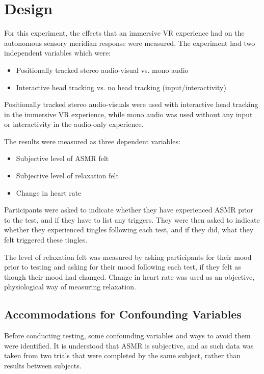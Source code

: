 \documentclass{sigchi}
\begin{document}
\section{Design}
For this experiment, the effects that an immersive VR experience had on the autonomous sensory meridian response were measured. The experiment had two independent variables which were:
\begin{itemize}
\item{Positionally tracked stereo audio-visual vs. mono audio}
\item{Interactive head tracking vs. no head tracking (input/interactivity)}
\end{itemize}

Positionally tracked stereo audio-visuals were used with interactive head tracking in the immersive VR experience, while mono audio was used without any input or interactivity in the audio-only experience.

The results were measured as three dependent variables:

\begin{itemize}
\item{Subjective level of ASMR felt}
\item{Subjective level of relaxation felt}
\item{Change in heart rate}
\end{itemize}

Participants were asked to indicate whether they have experienced ASMR prior to the test, and if they have to list any triggers. They were then asked to indicate whether they experienced tingles following each test, and if they did, what they felt triggered these tingles.

The level of relaxation felt was measured by asking participants for their mood prior to testing and asking for their mood following each test, if they felt as though their mood had changed. Change in heart rate was used as an objective, physiological way of measuring relaxation.

\subsection{Accommodations for Confounding Variables}
Before conducting testing, some confounding variables and ways to avoid them were identified. It is understood that ASMR is subjective, and as such data was taken from two trials that were completed by the same subject, rather than results between subjects. 
\end{document}
